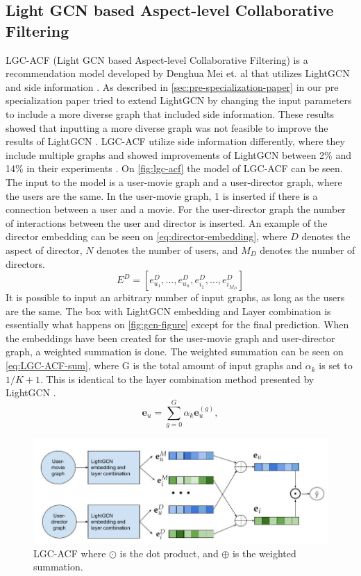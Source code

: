 \subsection{Light GCN based Aspect-level Collaborative Filtering}
LGC-ACF (Light GCN based Aspect-level Collaborative Filtering) is a recommendation model developed by Denghua Mei et. al that utilizes LightGCN and side information \cite{LGC-ACF}.
As described in \autoref{sec:pre-specialization-paper} in our pre specialization paper tried to extend LightGCN by changing the input parameters to include a more diverse graph that included side information.
These results showed that inputting a more diverse graph was not feasible to improve the results of LightGCN \cite{Pre-specialisation}.
LGC-ACF utilize side information differently, where they include multiple graphs and showed improvements of LightGCN between 2\% and 14\% in their experiments \cite{LGC-ACF}.
On \autoref{fig:lgc-acf} the model of LGC-ACF can be seen.
The input to the model is a user-movie graph and a user-director graph, where the users are the same.
In the user-movie graph, 1 is inserted if there is a connection between a user and a movie.
For the user-director graph the number of interactions between the user and director is inserted.
An example of the director embedding can be seen on \autoref{eq:director-embedding}, where $D$ denotes the aspect of director, $N$ denotes the number of users, and $M_D$ denotes the number of directors.
\begin{equation}
    E^D = [e_{u_1}^D, ... , e_{u_n}^D, e_{i_1}^D, ..., e_{i_{M_D}}^D]
    \label{eq:director-embedding}
\end{equation}
It is possible to input an arbitrary number of input graphs, as long as the users are the same.
The box with LightGCN embedding and Layer combination is essentially what happens on \autoref{fig:gcn-figure} except for the final prediction.
When the embeddings have been created for the user-movie graph and user-director graph, a weighted summation is done.
The weighted summation can be seen on \autoref{eq:LGC-ACF-sum}, where G is the total amount of input graphs and $\alpha_k$ is set to $1/K + 1$.
This is identical to the layer combination method presented by LightGCN \cite{lightgcn}.
\begin{equation}
    \mathbf{e}_u = \sum_{g=0}^{G} \alpha_k \mathbf{e}_u^{(g)},
    \label{eq:LGC-ACF-sum}
\end{equation}
\begin{figure}[h!]
    \includegraphics[width=1.1\textwidth]{figures/LGC-ACF.jpg}
    \centering
    \caption{LGC-ACF where $\odot$ is the dot product, and $\oplus$ is the weighted summation.}
    \label{fig:lgc-acf}
\end{figure}